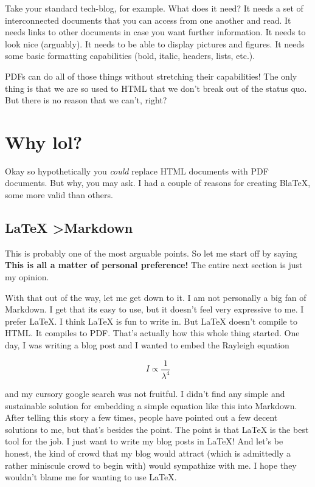 \documentclass[12pt]{article}
\begin{document}
  Take your standard tech-blog, for example. What does it need? It needs a set of interconnected documents that you can access from one another and read. It needs links to other documents in case you want further information. It needs to look nice (arguably). It needs to be able to display pictures and figures. It needs some basic formatting capabilities (bold, italic, headers, lists, etc.). 

  PDFs can do all of those things without stretching their capabilities! The only thing is that we are so used to HTML that we don't break out of the status quo. But there is no reason that we can't, right? 

  \section{Why lol?}

  Okay so hypothetically you \textit{could} replace HTML documents with PDF documents. But why, you may ask. I had a couple of reasons for creating BlaTeX, some more valid than others. 

  \subsection{LaTeX \textgreater  Markdown}

  This is probably one of the most arguable points. So let me start off by saying \textbf{This is all a matter of personal preference!} The entire next section is just my opinion. 

  With that out of the way, let me get down to it. I am not personally a big fan of Markdown. I get that its easy to use, but it doesn't feel very expressive to me. I prefer LaTeX. I think LaTeX is fun to write in. But LaTeX doesn't compile to HTML. It compiles to PDF. That's actually how this whole thing started. One day, I was writing a blog post and I wanted to embed the Rayleigh equation 

  \begin{displaymath}
  I \propto \frac{1}{\lambda^4}
  \end{displaymath}

  and my cursory google search was not fruitful. I didn't find any simple and sustainable solution for embedding a simple equation like this into Markdown. After telling this story a few times, people have pointed out a few decent solutions to me, but that's besides the point. The point is that LaTeX is the best tool for the job. I just want to write my blog posts in LaTeX! And let's be honest, the kind of crowd that my blog would attract (which is admittedly a rather miniscule crowd to begin with) would sympathize with me. I hope they wouldn't blame me for wanting to use LaTeX. 
\end{document}
